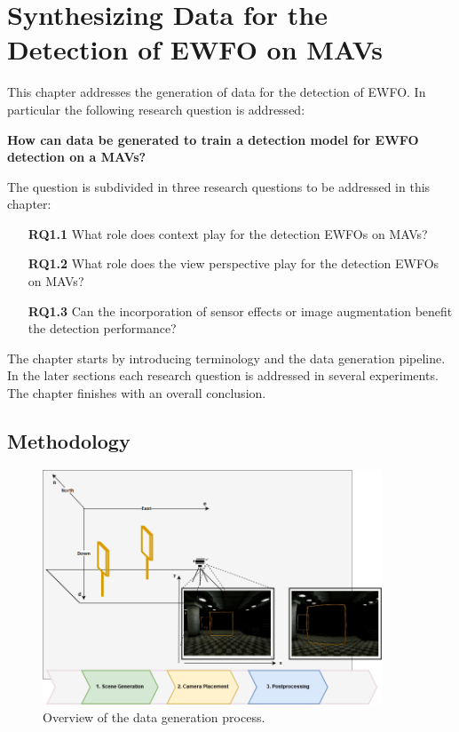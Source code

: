 \chapter{Synthesizing Data for the Detection of \ac{EWFO} on \acp{MAV}}

This chapter addresses the generation of data for the detection of \ac{EWFO}. In particular the following research question is addressed:\\
\begin{centering}
\textbf{How can data be generated to train a detection model for \ac{EWFO} detection on a \acp{MAV}?}
\end{centering}

The question is subdivided in three research questions to be addressed in this chapter:
\begin{enumerate}
	\item[\textbf{RQ1.1}] What role does context play for the detection \acp{EWFO} on \acp{MAV}?
	\item[\textbf{RQ1.2}] What role does the view perspective play for the detection \acp{EWFO} on \acp{MAV}?
	\item[\textbf{RQ1.3}] Can the incorporation of sensor effects or image augmentation benefit the detection performance?
\end{enumerate}

The chapter starts by introducing terminology and the data generation pipeline. In the later sections each research question is addressed in several experiments. The chapter finishes with an overall conclusion.

\section{Methodology}
\label{sec:datagen:method}
\begin{figure}[htbp]
	\centering
	\includegraphics[width=0.9\textwidth]{fig/datagen_notation}
	\caption{Overview of the data generation process.}
	\label{fig:training:datagen_notation}
\end{figure}

